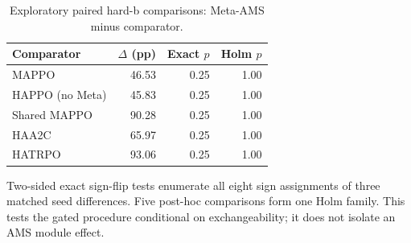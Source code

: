 \begin{table}[t]
\centering
\caption{Exploratory paired hard-b comparisons: Meta-AMS minus comparator.}
\label{tab:tests}
\small
\setlength{\tabcolsep}{4pt}
\begin{tabular}{lrrr}
\toprule
Comparator & $\Delta$ (pp) & Exact $p$ & Holm $p$ \\
\midrule
MAPPO & 46.53 & 0.25 & 1.00 \\
HAPPO (no Meta) & 45.83 & 0.25 & 1.00 \\
Shared MAPPO & 90.28 & 0.25 & 1.00 \\
HAA2C & 65.97 & 0.25 & 1.00 \\
HATRPO & 93.06 & 0.25 & 1.00 \\
\bottomrule
\end{tabular}

\vspace{2pt}\begin{minipage}{\linewidth}\footnotesize Two-sided exact sign-flip tests enumerate all eight sign assignments of three matched seed differences. Five post-hoc comparisons form one Holm family. This tests the gated procedure conditional on exchangeability; it does not isolate an AMS module effect.\end{minipage}
\end{table}
